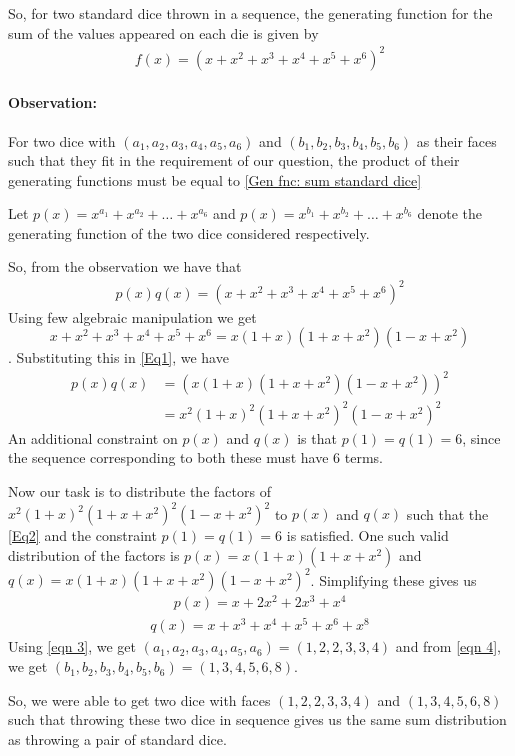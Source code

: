 So, for two standard dice thrown in a sequence, the generating function for the sum of the values appeared on each die is given by
\begin{align} \label{Gen fnc: sum standard dice}
    f(x)=(x+x^2+x^3+x^4+x^5+x^6)^2
\end{align}
\paragraph{Observation:} For two dice with  $(a_1,a_2,a_3,a_4,a_5,a_6)$ and $(b_1,b_2,b_3,b_4,b_5,b_6)$ as their faces such that they fit in the requirement of our question, the product of their generating functions must be equal to \ref{Gen fnc: sum standard dice} 

Let $p(x)=x^{a_1}+x^{a_2}+\dots+x^{a_6}$ and $p(x)=x^{b_1}+x^{b_2}+\dots+x^{b_6}$ denote the generating function of the two dice considered respectively.

So, from the observation we have that
\begin{align} \label{Eq1}
    p(x)q(x)=(x+x^2+x^3+x^4+x^5+x^6)^2
\end{align}
Using few algebraic manipulation we get $$x+x^2+x^3+x^4+x^5+x^6 = x(1+x)(1+x+x^2)(1-x+x^2)$$. Substituting this in \ref{Eq1}, we have 
\begin{align} \label{Eq2}
    p(x)q(x)&=(x(1+x)(1+x+x^2)(1-x+x^2))^2\nonumber\\
    & = x^2(1+x)^2(1+x+x^2)^2(1-x+x^2)^2
\end{align}
An additional constraint on $p(x)$ and $q(x)$ is that $p(1)=q(1)=6$, since the sequence corresponding to both these must have 6 terms.

Now our task is to distribute the factors of $x^2(1+x)^2(1+x+x^2)^2(1-x+x^2)^2$ to $p(x)$ and $q(x)$ such that the \ref{Eq2} and the constraint $p(1)=q(1)=6$ is satisfied.
One such valid distribution of the factors is $p(x)=x(1+x)(1+x+x^2)$
and $q(x)=x(1+x)(1+x+x^2)(1-x+x^2)^2$. Simplifying these gives us 
\begin{align}\label{eqn 3}
    p(x)=x + 2x^2 + 2x^3 + x^4
\end{align}
\begin{align}\label{eqn 4}
    q(x)=x + x^3 + x^4 + x^5 + x^6 + x^8
\end{align}
Using \ref{eqn 3}, we get $(a_1,a_2,a_3,a_4,a_5,a_6)=(1,2,2,3,3,4)$ and from \ref{eqn 4}, we get $(b_1,b_2,b_3,b_4,b_5,b_6)=(1,3,4,5,6,8)$.

So, we were able to get two dice with  faces $(1,2,2,3,3,4)$ and $(1,3,4,5,6,8)$ such that throwing these two dice in sequence gives us the same sum distribution as throwing a pair of standard dice.

